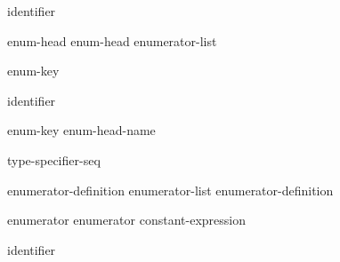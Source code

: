 \begin{bnf}
\br
    identifier
\end{bnf}

\begin{bnf}
\br
    enum-head \terminal{\{}  \terminal{\}}\br
    enum-head \terminal{\{} enumerator-list \terminal{,} \terminal{\}}
\end{bnf}

\begin{bnf}
\br
    enum-key   
\end{bnf}

\begin{bnf}
\br
     identifier
\end{bnf}

\begin{bnf}
\br
    enum-key  enum-head-name  \terminal{;}
\end{bnf}

\begin{bnf}
\br
    \br
     \br
     
\end{bnf}

\begin{bnf}
\br
    \terminal{:} type-specifier-seq
\end{bnf}

\begin{bnf}
\br
    enumerator-definition\br
    enumerator-list \terminal{,} enumerator-definition
\end{bnf}

\begin{bnf}
\br
    enumerator\br
    enumerator \terminal{=} constant-expression
\end{bnf}

\begin{bnf}
\br
    identifier 
\end{bnf}

